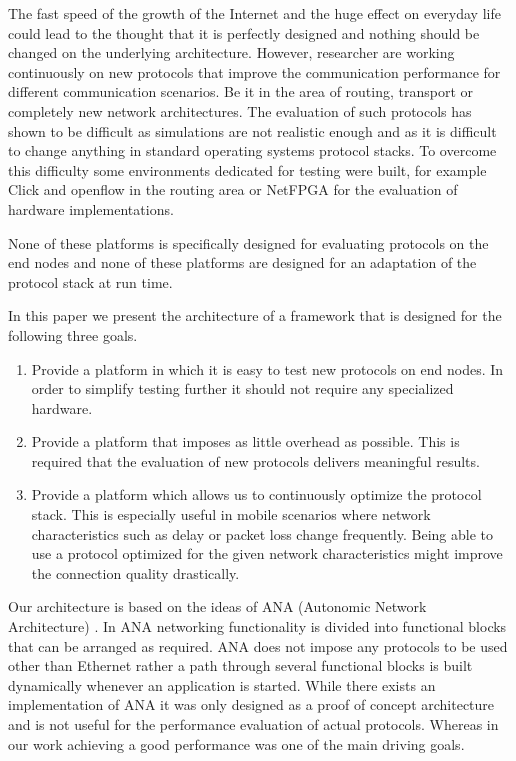 \documentclass{sig-alternate}
\begin{document}
The fast speed of the growth of the Internet and the huge effect on everyday life could lead to the thought that it is perfectly designed and nothing should be changed on the underlying architecture. However, researcher are working continuously on new protocols that improve the communication performance for different communication scenarios. Be it in the area of routing, transport or completely new network architectures. The evaluation of such protocols has shown to be difficult as simulations are not realistic enough and as it is difficult to change anything in standard operating systems protocol stacks. To overcome this difficulty some environments dedicated for testing were built, for example Click \cite{click} and openflow \cite{openflow} in the routing area or NetFPGA \cite{netFPGA} for the evaluation of hardware implementations. 

None of these platforms is specifically designed for evaluating protocols on the end nodes and none of these platforms are designed for an adaptation of the protocol stack at run time. 

In this paper we present the architecture of a framework that is designed for the following three goals. 
\begin{enumerate}
\item Provide a platform in which it is easy to test new protocols on end nodes. In order to simplify testing further it should not require any specialized hardware. 
\item Provide a platform that imposes as little overhead as possible. This is required that the evaluation of new protocols delivers meaningful results. 
\item Provide a platform which allows us to continuously optimize the protocol stack. This is especially useful in mobile scenarios where network characteristics such as delay or packet loss change frequently. Being able to use a protocol optimized for the given network characteristics might improve the connection quality drastically.
\end{enumerate}

Our architecture is based on the ideas of ANA (Autonomic Network Architecture) \cite{ANAJournal}.
In ANA networking functionality is divided into functional blocks that can be arranged as required. ANA does not impose any protocols to be used other than Ethernet rather a path through several functional blocks is built dynamically whenever an application is started.   
While there exists an implementation of ANA it was only designed as a proof of concept architecture and is not useful for the performance evaluation of actual protocols. Whereas in our work achieving a good performance was one of the main driving goals. 
\end{document}
